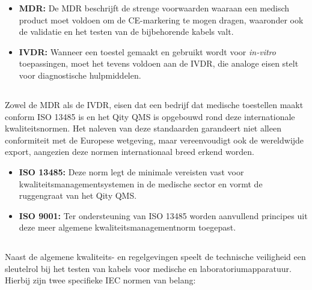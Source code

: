 \begin{itemize}
    \item \textbf{\gls{MDR}\autocite{MDR2017}:} De \gls{MDR} beschrijft de strenge voorwaarden waaraan een medisch product moet voldoen om de CE-markering te mogen dragen, waaronder ook de validatie en het testen van de bijbehorende kabels valt.
    
    \item \textbf{\gls{IVDR}\autocite{IVDR2017}:} Wanneer een toestel gemaakt en gebruikt wordt voor \textit{in-vitro} toepassingen, moet het tevens voldoen aan de \gls{IVDR}, die analoge eisen stelt voor diagnostische hulpmiddelen.
\end{itemize}

\subsection{}%
\label{ssec:kwaliteitsnormen}
Zowel de \gls{MDR} als de \gls{IVDR}, eisen dat een bedrijf dat medische toestellen maakt conform \gls{ISO} 13485 is en het Qity \gls{QMS} is opgebouwd rond deze internationale kwaliteitsnormen. Het naleven van deze standaarden garandeert niet alleen conformiteit met de Europese wetgeving, maar vereenvoudigt ook de wereldwijde export, aangezien deze normen internationaal breed erkend worden\autocite{Muehendislik2025}.

\begin{itemize}
    \item \textbf{\gls{ISO} 13485\autocite{ISO13485}:} Deze norm legt de minimale vereisten vast voor kwaliteitsmanagementsystemen in de medische sector en vormt de ruggengraat van het Qity \gls{QMS}.
    
    \item \textbf{\gls{ISO} 9001\autocite{ISO9001}:} Ter ondersteuning van \gls{ISO} 13485 worden aanvullend principes uit deze meer algemene kwaliteitsmanagementnorm toegepast.
\end{itemize}

\subsection{}%
\label{ssec:veiligheidsnormen}
Naast de algemene kwaliteits- en regelgevingen speelt de technische veiligheid een sleutelrol bij het testen van kabels voor medische en laboratoriumapparatuur. Hierbij zijn twee specifieke \gls{IEC} normen van belang:


